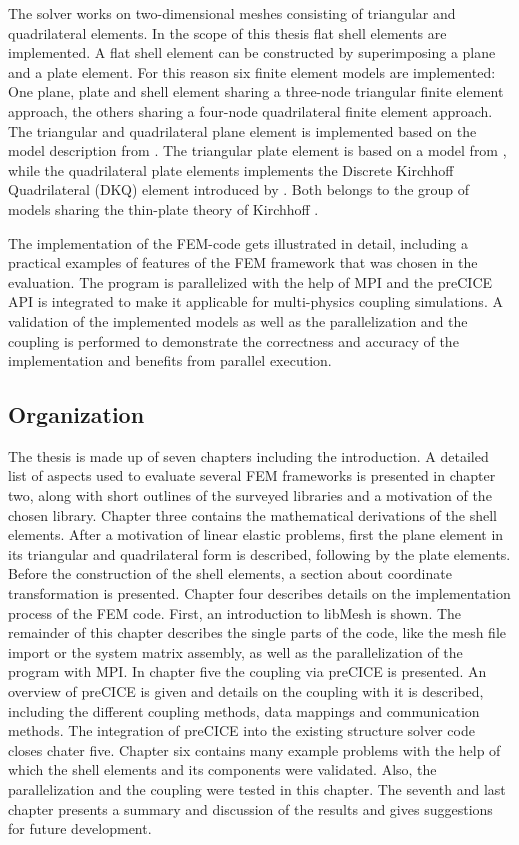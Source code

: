 The solver works on two-dimensional meshes consisting of triangular and quadrilateral elements. In the scope of this thesis flat shell elements are implemented. A flat shell element can be constructed by superimposing a plane and a plate element. For this reason six finite element models are implemented: One plane, plate and shell element sharing a three-node triangular finite element approach, the others sharing a four-node quadrilateral finite element approach. The triangular and quadrilateral plane element is implemented based on the model description from \cite{steinke2005finite}. The triangular plate element is based on a model from \cite{specht1988modified}, while the quadrilateral plate elements implements the Discrete Kirchhoff Quadrilateral (DKQ) element introduced by \cite{zienkiewicz2000finite}. Both belongs to the group of models sharing the thin-plate theory of Kirchhoff \cite{steinke2005finite}.

The implementation of the FEM-code gets illustrated in detail, including a practical examples of features of the FEM framework that was chosen in the evaluation. The program is parallelized with the help of MPI and the preCICE API is integrated to make it applicable for multi-physics coupling simulations. A validation of the implemented models as well as the parallelization and the coupling is performed to demonstrate the correctness and accuracy of the implementation and benefits from parallel execution.

\subsection{Organization}
The thesis is made up of seven chapters including the introduction. A detailed list of aspects used to evaluate several FEM frameworks is presented in chapter two, along with short outlines of the surveyed libraries and a motivation of the chosen library. Chapter three contains the mathematical derivations of the shell elements. After a motivation of linear elastic problems, first the plane element in its triangular and quadrilateral form is described, following by the plate elements. Before the construction of the shell elements, a section about coordinate transformation is presented. Chapter four describes details on the implementation process of the FEM code. First, an introduction to libMesh is shown. The remainder of this chapter describes the single parts of the code, like the mesh file import or the system matrix assembly, as well as the parallelization of the program with MPI. In chapter five the coupling via preCICE is presented. An overview of preCICE is given and details on the coupling with it is described, including the different coupling methods, data mappings and communication methods. The integration of preCICE into the existing structure solver code closes chater five. Chapter six contains many example problems with the help of which the shell elements and its components were validated. Also, the parallelization and the coupling were tested in this chapter. The seventh and last chapter presents a summary and discussion of the results and gives suggestions for future development.

\newpage